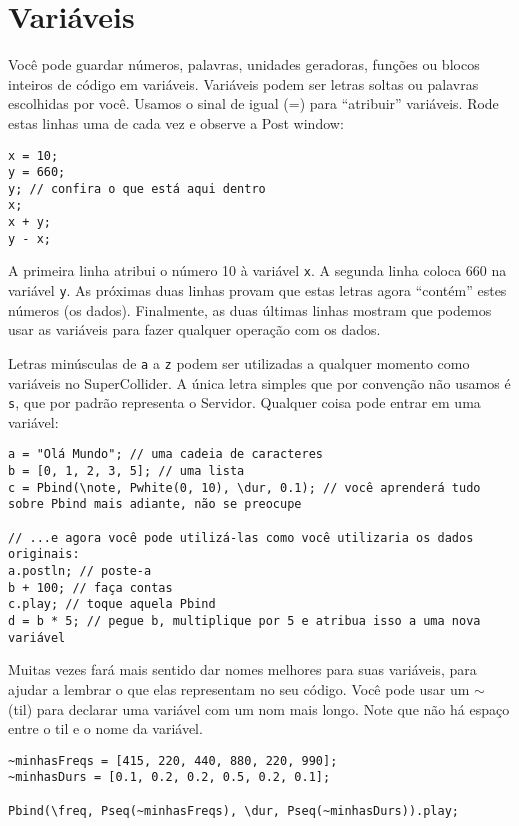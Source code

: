 \section{Variáveis}
\label{sec:variables}

Você pode guardar números, palavras, unidades geradoras, funções ou blocos inteiros de código em variáveis. Variáveis podem ser letras soltas ou palavras escolhidas por você. Usamos o sinal de igual (=) para “atribuir” variáveis. Rode estas linhas uma de cada vez e observe a Post window:

 
\begin{lstlisting}[style=SuperCollider-IDE, basicstyle=\scttfamily\footnotesize]
x = 10;
y = 660;
y; // confira o que está aqui dentro
x;
x + y;
y - x;
\end{lstlisting}
 

A primeira linha atribui o número 10 à variável \texttt{x}. A segunda linha coloca 660 na variável \texttt{y}. As próximas duas linhas provam que estas letras agora “contém” estes números (os dados). Finalmente, as duas últimas linhas mostram que podemos usar as variáveis para fazer qualquer operação com os dados.

Letras minúsculas de \texttt{a} a \texttt{z} podem ser utilizadas a qualquer momento como variáveis no SuperCollider. A única letra simples que por convenção não usamos é \texttt{s}, que por padrão representa o Servidor. Qualquer coisa pode entrar em uma variável:
 
\begin{lstlisting}[style=SuperCollider-IDE, basicstyle=\scttfamily\footnotesize]
a = "Olá Mundo"; // uma cadeia de caracteres
b = [0, 1, 2, 3, 5]; // uma lista
c = Pbind(\note, Pwhite(0, 10), \dur, 0.1); // você aprenderá tudo sobre Pbind mais adiante, não se preocupe

// ...e agora você pode utilizá-las como você utilizaria os dados originais:
a.postln; // poste-a
b + 100; // faça contas
c.play; // toque aquela Pbind
d = b * 5; // pegue b, multiplique por 5 e atribua isso a uma nova variável
\end{lstlisting}

Muitas vezes fará mais sentido dar nomes melhores para suas variáveis, para ajudar a lembrar o que elas representam no seu código. Você pode usar um $\sim$ (til) para declarar uma variável com um nom mais longo. Note que não há espaço entre o til e o nome da variável.

\begin{lstlisting}[style=SuperCollider-IDE, basicstyle=\scttfamily\footnotesize]
~minhasFreqs = [415, 220, 440, 880, 220, 990];
~minhasDurs = [0.1, 0.2, 0.2, 0.5, 0.2, 0.1];

Pbind(\freq, Pseq(~minhasFreqs), \dur, Pseq(~minhasDurs)).play;
\end{lstlisting}
 

